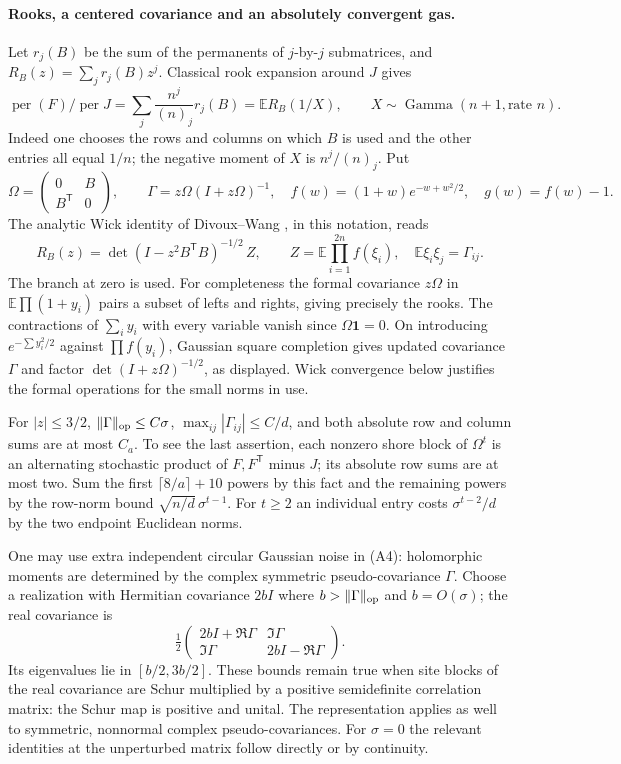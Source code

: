 \paragraph{Rooks, a centered covariance and an absolutely convergent gas.}
Let $r_j(B)$ be the sum of the permanents of $j$-by-$j$ submatrices, and $R_B(z)=\sum_j r_j(B)z^j$. Classical rook expansion around $J$ gives
\[
 \operatorname{per}(F)/\operatorname{per}J
  =\sum_j\frac{n^j}{(n)_j}r_j(B)=\mathbb E R_B(1/X),
 \qquad X\sim\operatorname{Gamma}(n+1,\text{rate }n).
 \tag{A3}
\]
Indeed one chooses the rows and columns on which $B$ is used and the other entries all equal $1/n$; the negative moment of $X$ is $n^j/(n)_j$. Put
\[
 \Omega=\begin{pmatrix}0&B\\ B^{\mathsf T}&0\end{pmatrix},
 \qquad \Gamma=z\Omega(I+z\Omega)^{-1},\quad
 f(w)=(1+w)e^{-w+w^2/2},\quad g(w)=f(w)-1.
\]
The analytic Wick identity of Divoux--Wang \cite[Sec.~3]{DW}, in this notation, reads
\[
 R_B(z)=\det(I-z^2B^{\mathsf T}B)^{-1/2}\,
               Z,\qquad Z=\mathbb E\prod_{i=1}^{2n}f(\xi_i),
 \quad \mathbb E\xi_i\xi_j=\Gamma_{ij}.                    \tag{A4}
\]
The branch at zero is used. For completeness the formal covariance $z\Omega$ in $\mathbb E\prod(1+y_i)$ pairs a subset of lefts and rights, giving precisely the rooks. The contractions of $\sum_i y_i$ with every variable vanish since $\Omega\mathbf1=0$. On introducing $e^{-\sum y_i^2/2}$ against $\prod f(y_i)$, Gaussian square completion gives updated covariance $\Gamma$ and factor $\det(I+z\Omega)^{-1/2}$, as displayed. Wick convergence below justifies the formal operations for the small norms in use.

For $|z|\le 3/2$, $\|\Gamma\|_{\rm op}\le C\sigma$, $\max_{ij}|\Gamma_{ij}|\le C/d$, and both absolute row and column sums are at most $C_a$. To see the last assertion, each nonzero shore block of $\Omega^t$ is an alternating stochastic product of $F,F^{\mathsf T}$ minus $J$; its absolute row sums are at most two. Sum the first $\lceil 8/a\rceil+10$ powers by this fact and the remaining powers by the row-norm bound $\sqrt{n/d}\,\sigma^{t-1}$. For $t\ge2$ an individual entry costs $\sigma^{t-2}/d$ by the two endpoint Euclidean norms.

One may use extra independent circular Gaussian noise in (A4): holomorphic moments are determined by the complex symmetric pseudo-covariance $\Gamma$. Choose a realization with Hermitian covariance $2b I$ where $b>\|\Gamma\|_{\rm op}$ and $b=O(\sigma)$; the real covariance is
\[
 \tfrac12\begin{pmatrix}2b I+\Re\Gamma&\Im\Gamma\\
                    \Im\Gamma&2b I-\Re\Gamma\end{pmatrix}.
\]
Its eigenvalues lie in $[b/2,3b/2]$. These bounds remain true when site blocks of the real covariance are Schur multiplied by a positive semidefinite correlation matrix: the Schur map is positive and unital. The representation applies as well to symmetric, nonnormal complex pseudo-covariances. For $\sigma=0$ the relevant identities at the unperturbed matrix follow directly or by continuity.

